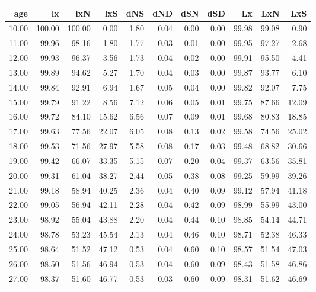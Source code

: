 \begin{table}[ht]
\centering
\begin{tabular}{rrrrrrrrrrr}
  \hline
age & lx & lxN & lxS & dNS & dND & dSN & dSD & Lx & LxN & LxS \\ 
  \hline
10.00 & 100.00 & 100.00 & 0.00 & 1.80 & 0.04 & 0.00 & 0.00 & 99.98 & 99.08 & 0.90 \\ 
  11.00 & 99.96 & 98.16 & 1.80 & 1.77 & 0.03 & 0.01 & 0.00 & 99.95 & 97.27 & 2.68 \\ 
  12.00 & 99.93 & 96.37 & 3.56 & 1.73 & 0.04 & 0.02 & 0.00 & 99.91 & 95.50 & 4.41 \\ 
  13.00 & 99.89 & 94.62 & 5.27 & 1.70 & 0.04 & 0.03 & 0.00 & 99.87 & 93.77 & 6.10 \\ 
  14.00 & 99.84 & 92.91 & 6.94 & 1.67 & 0.05 & 0.04 & 0.00 & 99.82 & 92.07 & 7.75 \\ 
  15.00 & 99.79 & 91.22 & 8.56 & 7.12 & 0.06 & 0.05 & 0.01 & 99.75 & 87.66 & 12.09 \\ 
  16.00 & 99.72 & 84.10 & 15.62 & 6.56 & 0.07 & 0.09 & 0.01 & 99.68 & 80.83 & 18.85 \\ 
  17.00 & 99.63 & 77.56 & 22.07 & 6.05 & 0.08 & 0.13 & 0.02 & 99.58 & 74.56 & 25.02 \\ 
  18.00 & 99.53 & 71.56 & 27.97 & 5.58 & 0.08 & 0.17 & 0.03 & 99.48 & 68.82 & 30.66 \\ 
  19.00 & 99.42 & 66.07 & 33.35 & 5.15 & 0.07 & 0.20 & 0.04 & 99.37 & 63.56 & 35.81 \\ 
  20.00 & 99.31 & 61.04 & 38.27 & 2.44 & 0.05 & 0.38 & 0.08 & 99.25 & 59.99 & 39.26 \\ 
  21.00 & 99.18 & 58.94 & 40.25 & 2.36 & 0.04 & 0.40 & 0.09 & 99.12 & 57.94 & 41.18 \\ 
  22.00 & 99.05 & 56.94 & 42.11 & 2.28 & 0.04 & 0.42 & 0.09 & 98.99 & 55.99 & 43.00 \\ 
  23.00 & 98.92 & 55.04 & 43.88 & 2.20 & 0.04 & 0.44 & 0.10 & 98.85 & 54.14 & 44.71 \\ 
  24.00 & 98.78 & 53.23 & 45.54 & 2.13 & 0.04 & 0.46 & 0.10 & 98.71 & 52.38 & 46.33 \\ 
  25.00 & 98.64 & 51.52 & 47.12 & 0.53 & 0.04 & 0.60 & 0.10 & 98.57 & 51.54 & 47.03 \\ 
  26.00 & 98.50 & 51.56 & 46.94 & 0.53 & 0.04 & 0.60 & 0.09 & 98.43 & 51.58 & 46.86 \\ 
  27.00 & 98.37 & 51.60 & 46.77 & 0.53 & 0.03 & 0.60 & 0.09 & 98.31 & 51.62 & 46.69 \\ 

\end{tabular}
\end{table}
